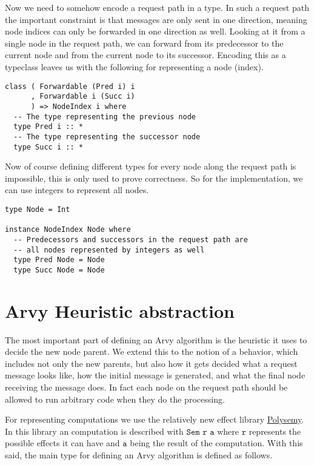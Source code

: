 \documentclass[a4paper, oneside]{discothesis}
\begin{document}
Now we need to somehow encode a request path in a type. In such a request path the important constraint is that messages are only sent in one direction, meaning node indices can only be forwarded in one direction as well. Looking at it from a single node in the request path, we can forward from its predecessor to the current node and from the current node to its successor. Encoding this as a typeclass leaves us with the following for representing a node (index).

\begin{verbatim}
class ( Forwardable (Pred i) i
      , Forwardable i (Succ i)
      ) => NodeIndex i where
  -- The type representing the previous node
  type Pred i :: *
  -- The type representing the successor node
  type Succ i :: *
\end{verbatim}

Now of course defining different types for every node along the request path is impossible, this is only used to prove correctness. So for the implementation, we can use integers to represent all nodes.

\begin{verbatim}
type Node = Int

instance NodeIndex Node where
  -- Predecessors and successors in the request path are
  -- all nodes represented by integers as well
  type Pred Node = Node
  type Succ Node = Node
\end{verbatim}

\section{Arvy Heuristic abstraction}

The most important part of defining an Arvy algorithm is the heuristic it uses to decide the new node parent. We extend this to the notion of a behavior, which includes not only the new parents, but also how it gets decided what a request message looks like, how the initial message is generated, and what the final node receiving the message does. In fact each node on the request path should be allowed to run arbitrary code when they do the processing.

For representing computations we use the relatively new effect library \href{https://hackage.haskell.org/package/polysemy}{Polysemy}. In this library an computation is described with $\texttt{Sem r a}$ where $\texttt{r}$ represents the possible effects it can have and $\texttt{a}$ being the result of the computation. With this said, the main type for defining an Arvy algorithm is defined as follows.
\end{document}
